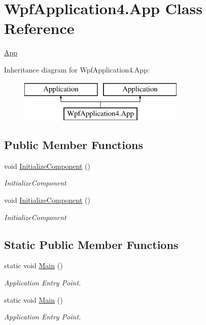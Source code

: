 \hypertarget{classWpfApplication4_1_1App}{\section{Wpf\-Application4.\-App Class Reference}
\label{classWpfApplication4_1_1App}
}


\hyperlink{classWpfApplication4_1_1App}{App}  


Inheritance diagram for Wpf\-Application4.\-App\-:\begin{figure}[H]
\begin{center}
\leavevmode
\includegraphics[height=2.000000cm]{classWpfApplication4_1_1App}
\end{center}
\end{figure}
\subsection*{Public Member Functions}
\begin{DoxyCompactItemize}
\item 
void \hyperlink{classWpfApplication4_1_1App_a771c9d33fc561f332b66df12e2df001c}{Initialize\-Component} ()
\begin{DoxyCompactList}\small\item\em Initialize\-Component \end{DoxyCompactList}\item 
void \hyperlink{classWpfApplication4_1_1App_a771c9d33fc561f332b66df12e2df001c}{Initialize\-Component} ()
\begin{DoxyCompactList}\small\item\em Initialize\-Component \end{DoxyCompactList}\end{DoxyCompactItemize}
\subsection*{Static Public Member Functions}
\begin{DoxyCompactItemize}
\item 
static void \hyperlink{classWpfApplication4_1_1App_af9d156f9d05b42856f01e9d71fa7ae9a}{Main} ()
\begin{DoxyCompactList}\small\item\em Application Entry Point. \end{DoxyCompactList}\item 
static void \hyperlink{classWpfApplication4_1_1App_af9d156f9d05b42856f01e9d71fa7ae9a}{Main} ()
\begin{DoxyCompactList}\small\item\em Application Entry Point. \end{DoxyCompactList}\end{DoxyCompactItemize}


